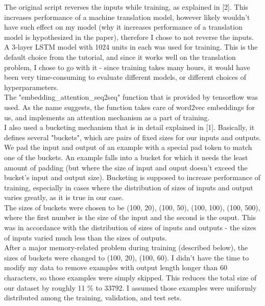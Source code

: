 \documentclass[12pt]{article}
\begin{document}
The original script reverses the inputs while training, as explained in [2]. This increases performance of a machine translation model, however likely wouldn't have such effect on my model (why it increases performance of a translation model is hypothesized in the paper), therefore I chose to not reverse the inputs. \\

A 3-layer LSTM model with 1024 units in each was used for training. This is the default choice from the tutorial, and since it works well on the translation problem, I chose to go with it - since training takes many hours, it would have been very time-consuming to evaluate different models, or different choices of hyperparameters. \\

The "embedding\_attention\_seq2seq" function that is provided by tensorflow was used. As the name suggests, the function takes care of word2vec embeddings for us, and implements an attention mechanism as a part of training. \\

I also used a bucketing mechanism that is in detail explained in [1].  Basically, it defines several "buckets", which are pairs of fixed sizes for our inputs and outputs. We pad the input and output of an example with a special pad token to match one of the buckets. An example falls into a bucket for which it needs the least amount of padding (but where the size of input and ouput doesn't exceed the bucket's input and output size). Bucketing is supposed to increase performance of training, especially in cases where the distribution of sizes of inputs and output varies greatly, as it is true in our case.\\

The sizes of buckets were chosen to be (100, 20), (100, 50), (100, 100), (100, 500), where the first number is the size of the input and the second is the ouput. This was in accordance with the distribution of sizes of inputs and outputs - the sizes of inputs varied much less than the sizes of outputs. \\

After a major memory-related problem during training (described below), the sizes of buckets were changed to (100, 20), (100, 60). I didn't have the time to modify my data to remove examples with output length longer than 60 characters, so those examples were simply skipped. This reduces the total size of our dataset by roughly 11 \% to 33792. I assumed those examples were uniformly distributed among the training, validation, and test sets.
\end{document}
